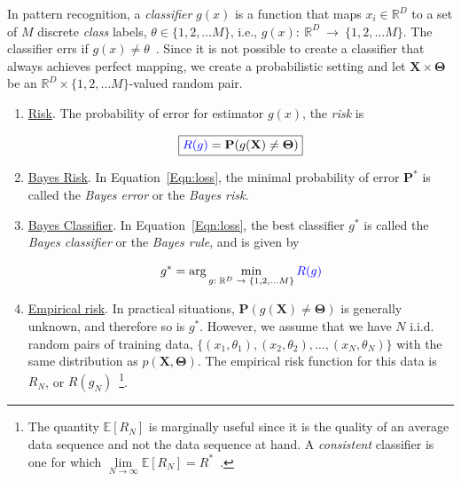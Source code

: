 In pattern recognition, a \emph{classifier} $g(x)$ is a function that maps $x_i \in \mathbb{R}^D$ to a set of $M$ discrete \emph{class} labels, $\theta  \in \{1, 2, \ldots M\}$, i.e., $g(x):~\mathbb{R}^D~\rightarrow~\{1, 2, \ldots M\}$.  The classifier errs if $g(x) \neq \theta$~\cite{1996_BOOK_PR_DevroyeGyorfiLugosi}.  Since it is not possible to create a classifier that always achieves perfect mapping, we create a probabilistic setting and let $\mathbf{X} \times \mathbf{\Theta}$ be an $\mathbb{R}^D \times \{1, 2, \ldots M\}$-valued random pair.  

\begin{enumerate}
\item \underline{Risk}.  The probability of error for estimator $g(x)$, the {\color{blue}\emph{risk}} is

\begin{equation}
\boxed{
{\color{blue}R(g)} = \mathbf{P}(g(\mathbf{X}) \neq \mathbf{\Theta})}
\label{Eqn:loss}
\end{equation}

\item \underline{Bayes Risk}. In Equation~\ref{Eqn:loss}, the minimal probability of error $\mathbf{P}^*$ is called the \emph{Bayes error} or the \emph{Bayes risk}.  

\item \underline{Bayes Classifier}.  In Equation~\ref{Eqn:loss}, the best classifier $g^*$ is called the \emph{Bayes classifier} or the \emph{Bayes rule}, and is given by

\begin{equation}
g^* = \arg\min_{\tiny g:~\mathbb{R}^D~\rightarrow~\{1, 2, \ldots M\}} {\color{blue}R(g)}
\end{equation}

\item \underline{Empirical risk}. In practical situations, $\mathbf{P}(g(\mathbf{X}) \neq \mathbf{\Theta})$ is generally unknown, and therefore so is $g^*$.  However, we assume that we have $N$ i.i.d. random pairs of training data, $\{(x_1, \theta_1), (x_2, \theta_2), \ldots, (x_N, \theta_N)\}$ with the same distribution as $p(\mathbf{X},\mathbf{\Theta})$.  The empirical risk function for this data is $R_N$, or $R(g_N)$~\footnote{The quantity $\mathbb{E}\left[R_N\right]$ is marginally useful since it is the quality of an average data sequence and not the data sequence at hand.  A \emph{consistent} classifier is one for which $\lim\limits_{N \rightarrow \infty}\mathbb{E}\left[R_N\right] = R^*$~\cite{1996_BOOK_PR_DevroyeGyorfiLugosi}.}.
  

\end{enumerate}

